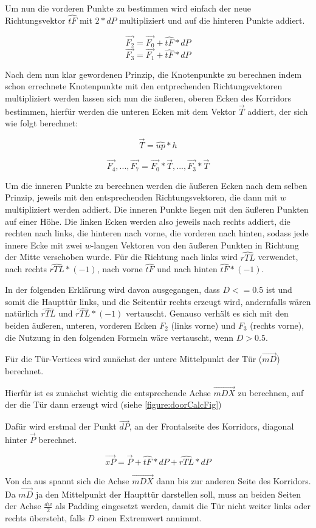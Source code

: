 Um nun die vorderen Punkte zu bestimmen wird einfach der neue Richtungsvektor $\hat{tF}$ mit $2 * dP$ multipliziert und auf die hinteren Punkte addiert.

$$ \vec{F_2} = \vec{F_0} + \hat{tF} * dP $$
$$ \vec{F_3} = \vec{F_1} + \hat{tF} * dP $$

Nach dem nun klar gewordenen Prinzip, die Knotenpunkte zu berechnen indem schon errechnete Knotenpunkte mit den entprechenden Richtungsvektoren multipliziert werden lassen sich nun die äußeren, oberen Ecken des Korridors bestimmen, hierfür werden die unteren Ecken mit dem Vektor $\vec{T}$ addiert, der sich wie folgt berechnet:

$$\vec{T} = \hat{up} * h $$

$$ \vec{F_4}, ..., \vec{F_7} = \vec{F_0} * \vec{T}, ..., \vec{F_3} * \vec{T} $$

Um die inneren Punkte zu berechnen werden die äußeren Ecken nach dem selben Prinzip, jeweils mit den entsprechenden Richtungsvektoren, die dann mit $w$ multipliziert werden addiert. Die inneren Punkte liegen mit den äußeren Punkten auf einer Höhe. Die linken Ecken werden also jeweils nach rechts addiert, die rechten nach links, die hinteren nach vorne, die vorderen nach hinten, sodass jede innere Ecke mit zwei $w$-langen Vektoren von den äußeren Punkten in Richtung der Mitte verschoben wurde. Für die Richtung nach links wird $\hat{rTL}$ verwendet, nach rechts $\hat{rTL} * (-1)$, nach vorne $\hat{tF}$ und nach hinten $\hat{tF} * (-1)$.

In der folgenden Erklärung wird davon ausgegangen, dass $D <= 0.5$ ist und somit die Haupttür links, und die Seitentür rechts erzeugt wird, andernfalls  wären natürlich $\hat{rTL}$ und $\hat{rTL} * (-1)$ vertauscht. Genauso verhält es sich mit den beiden äußeren, unteren, vorderen Ecken $F_2$ (links vorne) und $F_3$ (rechts vorne), die Nutzung in den folgenden Formeln wäre vertauscht, wenn $D > 0.5$.

Für die Tür-Vertices wird zunächst der untere Mittelpunkt der Tür ($\vec{mD}$) berechnet.

Hierfür ist es zunächst wichtig die entsprechende Achse $\vec{mDX}$ zu berechnen, auf der die Tür dann erzeugt wird (siehe \autoref{figure:doorCalcFig})

Dafür wird erstmal der Punkt $\vec{dP}$, an der Frontalseite des Korridors, diagonal hinter $\vec{P}$ berechnet.

$$\vec{xP} = \vec{P} + \hat{tF} * dP + \hat{rTL} * dP$$

Von da aus spannt sich die Achse $\vec{mDX}$ dann bis zur anderen Seite des Korridors. Da $\vec{mD}$ ja den Mittelpunkt der Haupttür darstellen soll, muss an beiden Seiten der Achse $\frac{dw}{2}$ als Padding eingesetzt werden, damit die Tür nicht weiter links oder rechts übersteht, falls $D$ einen Extremwert annimmt.


